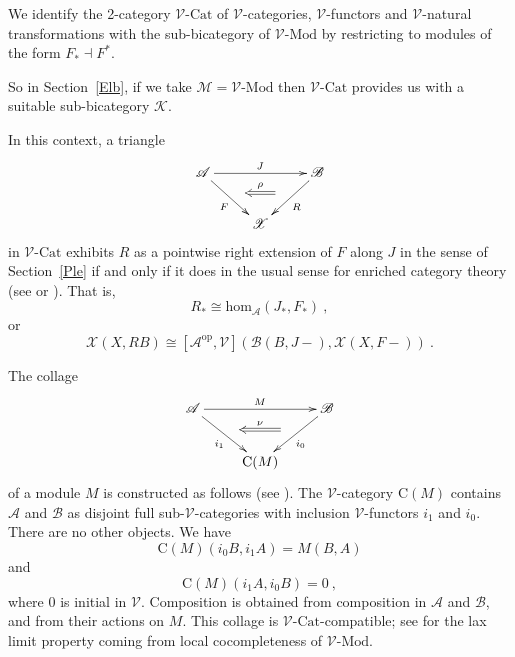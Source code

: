 \documentclass[a4paper,12pt]{article}
\theoremstyle{definition}
\theoremstyle{fact}
\theoremstyle{genquest}
\theoremstyle{step}
\def\CA{{\mathscr A}}
\def\CB{{\mathscr B}}
\def\CK{{\mathscr K}}
\def\CM{{\mathscr M}}
\def\CV{{\mathscr V}}
\def\CX{{\mathscr X}}
\begin{document}
{We identify the 2-category $\CV\text{-}\mathrm{Cat}$ of $\CV$-categories, $\CV$-functors
and $\CV$-natural transformations with the sub-bicategory of $\CV\text{-}\mathrm{Mod}$
by restricting to modules of the form $F_* \dashv F^*$.

So in Section~\ref{Elb}, if we take $\CM = \CV\text{-}\mathrm{Mod}$ then
$\CV\text{-}\mathrm{Cat}$ provides us with a suitable sub-bicategory $\CK$.  

In this context, a triangle   
\begin{equation}\label{maintriangleVcat}
\begin{aligned}
\xymatrix{
\CA \ar[rd]_{F}^(0.5){\phantom{a}}="1" \ar[rr]^{J}  && \CB \ar[ld]^{R}_(0.5){\phantom{a}}="2" \ar@{<=}"1";"2"^-{\rho}
\\ & \CX 
}
\end{aligned}
\end{equation}
in $\CV\text{-}\mathrm{Cat}$ exhibits $R$ as a pointwise right extension of $F$ along $J$
in the sense of Section~\ref{Ple} if and only if it does in the usual sense for enriched category
theory (see \cite{DubucThesis} or \cite{KellyBook}). That is, 
\begin{equation}
R_*\cong \mathrm{hom}_{\CA}(J_*,F_*) \ ,
\end{equation}
or
\begin{equation}
\CX(X,RB) \cong [\CA^{\mathrm{op}},\CV](\CB(B,J-),\CX(X,F-)) \ . 
\end{equation}

The collage
\begin{equation}\label{collmod}
\begin{aligned}
\xymatrix{
\CA \ar[rd]_{i_1}^(0.5){\phantom{a}}="1" \ar[rr]^{M}  && \CB \ar[ld]^{i_0}_(0.5){\phantom{a}}="2" \ar@{<=}"1";"2"^-{\nu}
\\
& \mathrm{C}(M) }
\end{aligned}
\end{equation}
of a module $M$ is constructed as follows (see \cite{FiB}).
The $\CV$-category $\mathrm{C}(M)$ contains $\CA$ and $\CB$
as disjoint full sub-$\CV$-categories with inclusion $\CV$-functors
$i_1$ and $i_0$. There are no other objects. We have
$$\mathrm{C}(M)(i_0B,i_1A) = M(B,A)$$
and
$$\mathrm{C}(M)(i_1A,i_0B) = 0 \ ,$$
where $0$ is initial in $\CV$. 
Composition is obtained from composition in $\CA$ and $\CB$, and
from their actions on $M$. This collage is $\CV\text{-}\mathrm{Cat}$-compatible;
see \cite{CCEC} for the lax limit property coming from local cocompleteness
of $\CV\text{-}\mathrm{Mod}$.  

}
\end{document}
